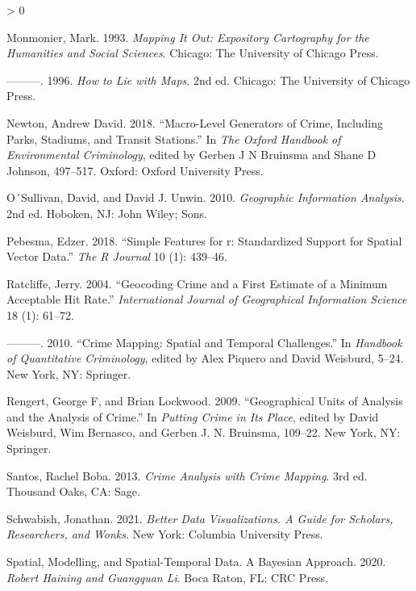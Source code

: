 \documentclass[
]{book}
\newlength{\cslhangindent}
\newenvironment{CSLReferences}[2] %
 {%
  \setlength{\parindent}{0pt}
  \ifodd #1 \everypar{\setlength{\hangindent}{\cslhangindent}}\ignorespaces\fi
  \ifnum #2 > 0
  \setlength{\parskip}{#2\baselineskip}
  \fi
 }%
 {}
\begin{document}
\begin{CSLReferences}{1}{0}
\leavevmode\hypertarget{ref-Monmonier_1993}{}%
Monmonier, Mark. 1993. \emph{Mapping It Out: Expository Cartography for the Humanities and Social Sciences}. Chicago: The University of Chicago Press.

\leavevmode\hypertarget{ref-Monmonier_1996}{}%
---------. 1996. \emph{How to Lie with Maps}. 2nd ed. Chicago: The University of Chicago Press.

\leavevmode\hypertarget{ref-Newton_2018}{}%
Newton, Andrew David. 2018. {``Macro-Level Generators of Crime, Including Parks, Stadiums, and Transit Stations.''} In \emph{The Oxford Handbook of Environmental Criminology}, edited by Gerben J N Bruinsma and Shane D Johnson, 497--517. Oxford: Oxford University Press.

\leavevmode\hypertarget{ref-OSullivan_2010}{}%
O´Sullivan, David, and David J. Unwin. 2010. \emph{Geographic Information Analysis}. 2nd ed. Hoboken, NJ: John Wiley; Sons.

\leavevmode\hypertarget{ref-Pebesma_2018}{}%
Pebesma, Edzer. 2018. {``Simple Features for r: Standardized Support for Spatial Vector Data.''} \emph{The R Journal} 10 (1): 439--46.

\leavevmode\hypertarget{ref-Ratcliffe_2004}{}%
Ratcliffe, Jerry. 2004. {``Geocoding Crime and a First Estimate of a Minimum Acceptable Hit Rate.''} \emph{International Journal of Geographical Information Science} 18 (1): 61--72.

\leavevmode\hypertarget{ref-Ratcliffe_2010}{}%
---------. 2010. {``Crime Mapping: Spatial and Temporal Challenges.''} In \emph{Handbook of Quantitative Criminology}, edited by Alex Piquero and David Weisburd, 5--24. New York, NY: Springer.

\leavevmode\hypertarget{ref-Rengert_2009}{}%
Rengert, George F, and Brian Lockwood. 2009. {``Geographical Units of Analysis and the Analysis of Crime.''} In \emph{Putting Crime in Its Place}, edited by David Weisburd, Wim Bernasco, and Gerben J. N. Bruinsma, 109--22. New York, NY: Springer.

\leavevmode\hypertarget{ref-Boba_2013}{}%
Santos, Rachel Boba. 2013. \emph{Crime Analysis with Crime Mapping}. 3rd ed. Thousand Oaks, CA: Sage.

\leavevmode\hypertarget{ref-Schwabish_2021}{}%
Schwabish, Jonathan. 2021. \emph{Better Data Visualizations. A Guide for Scholars, Researchers, and Wonks}. New York: Columbia University Press.

\leavevmode\hypertarget{ref-Haining_2020}{}%
Spatial, Modelling, and Spatial-Temporal Data. A Bayesian Approach. 2020. \emph{Robert Haining and Guangquan Li}. Boca Raton, FL: CRC Press.


\end{CSLReferences}
\end{document}
